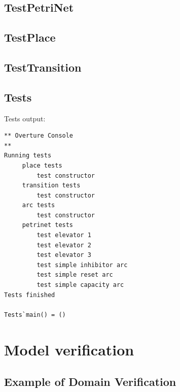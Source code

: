 \documentclass[a4paper]{article}
\begin{document}
\newpage

\subsection{TestPetriNet}


\newpage

\subsection{TestPlace}


\newpage

\subsection{TestTransition}


\newpage

\subsection{Tests}



Tests output:

\begin{verbatim}
** Overture Console
**
Running tests
     place tests
         test constructor
     transition tests
         test constructor
     arc tests
         test constructor
     petrinet tests
         test elevator 1
         test elevator 2
         test elevator 3
         test simple inhibitor arc
         test simple reset arc
         test simple capacity arc
Tests finished

Tests`main() = ()
\end{verbatim}

\newpage

\section {Model verification}


\subsection {Example of Domain Verification}
\end{document}
